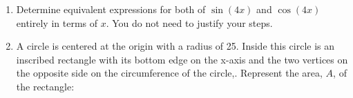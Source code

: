 \documentclass[12pt]{book}
\begin{document}
\begin{enumerate}
\begin{proof}
\addtolength{\jot}{1em}
\begin{align*}
    RHS &= \dfrac{\sin(x)+\cos(x)}{\sin(x)+\cos(x)}-\dfrac{\sin^3(x)}{\sin(x) + \cos(x)} - \dfrac{\cos^3(x)}{\sin(x) + \cos(x)} && 1 = \dfrac{\sin(x)+\cos(x)}{\sin(x)+\cos(x)} \\
    &= \dfrac{\sin(x)+\cos(x) - \sin^3(x) - \cos^3(x)}{\sin(x)+\cos(x)} && \text{Simplfy} \\
    &= \dfrac{\sin(x)+\cos(x) -(\sin(x))(\sin^2(x))  - (\cos(x))(\cos^2(x))}{\sin(x)+\cos(x)} \\
    &= \dfrac{\sin(x)+\cos(x) -(\sin(x))(1 - \cos^2(x))  - (\cos(x))(\cos^2(x))}{\sin(x)+\cos(x)} && \sin^2(x) = 1 - \cos^2(x) \\
    &= \dfrac{\sin(x)+\cos(x) -(\sin(x))(1 - \cos^2(x))  - (\cos(x))(1 - \sin^2(x))}{\sin(x)+\cos(x)} && \cos^2(x) = 1 - \sin^2(x) \\
    &= \dfrac{\sin(x)+\cos(x) -(\sin(x) - \cos^2(x)\sin(x))  - (\cos(x) - \sin^2(x)\cos(x))}{\sin(x)+\cos(x)} && \text{Expand} \\
    &= \dfrac{\sin(x)+\cos(x) - \sin(x) + \cos^2(x)\sin(x)  - \cos(x) + \sin^2(x)\cos(x)}{\sin(x)+\cos(x)} \\
    &= \dfrac{\cos^2(x)\sin(x) + \sin^2(x)\cos(x)}{\sin(x)+\cos(x)} && \text{Simplify}\\
    &= \dfrac{(\sin(x)\cos(x))(\sin(x) + \cos(x))}{\sin(x)+\cos(x)} && \text{Factor } \sin(x)\cos(x) on numerator\\
    &= \sin(x)\cos(x) && \text{Simplify}\\
    &= RHS \qedhere\\
\end{align*}
\end{proof}

\vspace{-1cm}
$$\therefore \sin(x)\cos(x)=1-\dfrac{\sin^2(x)}{1+\cot(x)}-\dfrac{\cos^2(x)}{1+\tan(x)}$$

\newpage

\item Determine equivalent expressions for both of $\sin(4x)$ and $\cos(4x)$ entirely in terms of $x$. You do not need to justify your steps.


\newpage

\item A circle is centered at the origin with a radius of 25. Inside this circle is an inscribed rectangle with its bottom edge on the x-axis and the two vertices on the opposite side on the circumference of the circle,. Represent the area, $A$, of the rectangle:


\end{enumerate}
\end{document}
